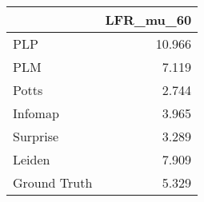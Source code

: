 \begin{tabular}{lr}
\toprule
{} & LFR_mu_60 \\
\midrule
PLP          &    10.966 \\
PLM          &     7.119 \\
Potts        &     2.744 \\
Infomap      &     3.965 \\
Surprise     &     3.289 \\
Leiden       &     7.909 \\
Ground Truth &     5.329 \\
\bottomrule
\end{tabular}
